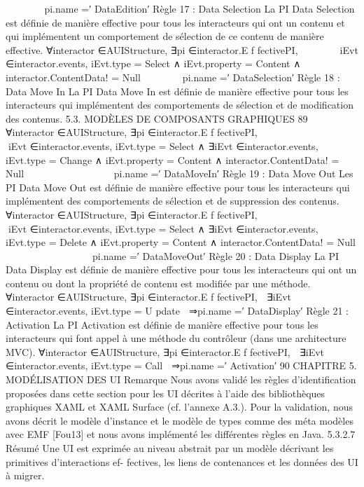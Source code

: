 \documentclass{article}
\begin{document}






⇒pi.name =′ DataEdition′
Règle 17 : Data Selection
La PI Data Selection est déﬁnie de manière effective pour tous les interacteurs qui ont un contenu
et qui implémentent un comportement de sélection de ce contenu de manière effective.
∀interactor ∈AUIStructure, ∃pi ∈interactor.E f fectivePI,






∃iEvt ∈interactor.events, iEvt.type = Select
∧
iEvt.property = Content
∧
interactor.ContentData! = Null






⇒pi.name =′ DataSelection′
Règle 18 : Data Move In
La PI Data Move In est déﬁnie de manière effective pour tous les interacteurs qui implémentent
des comportements de sélection et de modiﬁcation des contenus.
5.3. MODÈLES DE COMPOSANTS GRAPHIQUES
89
∀interactor ∈AUIStructure,
∃pi ∈interactor.E f fectivePI,














∃iEvt ∈interactor.events,
iEvt.type = Select
∧
∃iEvt ∈interactor.events,
iEvt.type = Change
∧
iEvt.property = Content
∧
interactor.ContentData! = Null














⇒pi.name =′ DataMoveIn′
Règle 19 : Data Move Out
Les PI Data Move Out est déﬁnie de manière effective pour tous les interacteurs qui implémentent
des comportements de sélection et de suppression des contenus.
∀interactor ∈AUIStructure,
∃pi ∈interactor.E f fectivePI,














∃iEvt ∈interactor.events,
iEvt.type = Select
∧
∃iEvt ∈interactor.events,
iEvt.type = Delete
∧
iEvt.property = Content
∧
interactor.ContentData! = Null














⇒pi.name =′ DataMoveOut′
Règle 20 : Data Display
La PI Data Display est déﬁnie de manière effective pour tous les interacteurs qui ont un contenu
ou dont la propriété de contenu est modiﬁée par une méthode.
∀interactor ∈AUIStructure, ∃pi ∈interactor.E f fectivePI,
 ∃iEvt ∈interactor.events,
iEvt.type = U pdate

⇒pi.name =′ DataDisplay′
Règle 21 : Activation
La PI Activation est déﬁnie de manière effective pour tous les interacteurs qui font appel à une
méthode du contrôleur (dans une architecture MVC).
∀interactor ∈AUIStructure, ∃pi ∈interactor.E f fectivePI,
 ∃iEvt ∈interactor.events,
iEvt.type = Call

⇒pi.name =′ Activation′
90
CHAPITRE 5. MODÉLISATION DES UI
Remarque
Nous avons validé les règles d’identiﬁcation proposées dans cette section pour les UI
décrites à l’aide des bibliothèques graphiques XAML et XAML Surface (cf. l’annexe A.3.). Pour la
validation, nous avons décrit le modèle d’instance et le modèle de types comme des méta modèles
avec EMF [Fou13] et nous avons implémenté les différentes règles en Java.
5.3.2.7
Résumé
Une UI est exprimée au niveau abstrait par un modèle décrivant les primitives d’interactions ef-
fectives, les liens de contenances et les données des UI à migrer.
\end{document}
